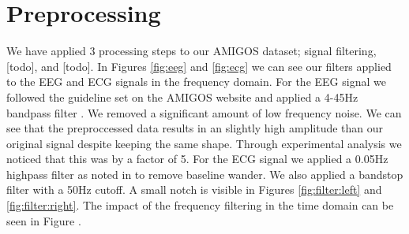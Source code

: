 
\FloatBarrier
\section{Preprocessing}
We have applied 3 processing steps to our AMIGOS dataset;
signal filtering, [todo], and [todo].
In Figures \ref{fig:eeg} and \ref{fig:ecg}
we can see our filters applied to the EEG and ECG signals in the frequency domain.
For the EEG signal we followed the guideline set on the AMIGOS
website and applied a 4-45Hz bandpass filter \cite{AMIGOS:2018}.
We removed a significant amount of low frequency noise.
We can see that the preproccessed data results
in an slightly high amplitude than our original signal despite keeping the same shape.
Through experimental analysis we noticed that this was by a factor of 5.
For the ECG signal we applied a 0.05Hz highpass filter as noted in
\cite{SantamariaGranados:2019}
to remove baseline wander.
We also applied a bandstop filter with a 50Hz cutoff.
A small notch is visible in
Figures \ref{fig:filter:left} and \ref{fig:filter:right}.
The impact of the frequency filtering in the time domain can be seen in Figure
\label{fig:ecg:time}.


\clearpage
